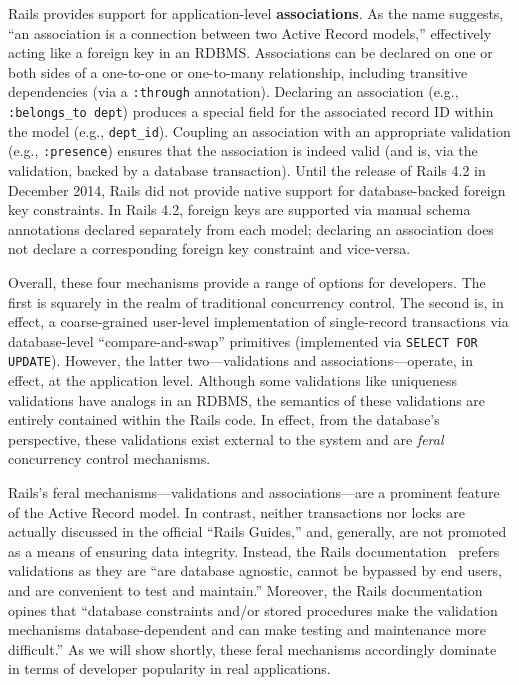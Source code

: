 \begin{myenumerate}
\item Rails provides support for application-level
  \textbf{associations}. As the name suggests, ``an association is a
  connection between two Active Record models,'' effectively acting
  like a foreign key in an RDBMS. Associations can be declared on one
  or both sides of a one-to-one or one-to-many relationship, including
  transitive dependencies (via a \texttt{:through}
  annotation). Declaring an association (e.g., \texttt{:belongs\_to
    dept}) produces a special field for the associated record ID
  within the model (e.g., \texttt{dept\_id}). Coupling an association
  with an appropriate validation (e.g., \texttt{:presence}) ensures
  that the association is indeed valid (and is, via the validation,
  backed by a database transaction). Until the release of Rails 4.2 in
  December 2014, Rails did not provide native support for
  database-backed foreign key constraints. In Rails 4.2, foreign keys
  are supported via manual schema annotations declared separately from
  each model; declaring an association does not declare a
  corresponding foreign key constraint and vice-versa.
\end{myenumerate}

Overall, these four mechanisms provide a range of options for
developers. The first is squarely in the realm of traditional
concurrency control. The second is, in effect, a coarse-grained
user-level implementation of single-record transactions via
database-level ``compare-and-swap'' primitives (implemented via
\texttt{SELECT FOR UPDATE}). However, the latter two---validations and
associations---operate, in effect, at the application level. Although
some validations like uniqueness validations have analogs in an RDBMS,
the semantics of these validations are entirely contained within the
Rails code. In effect, from the database's perspective, these
validations exist external to the system and are \textit{feral}
concurrency control mechanisms.

Rails's feral mechanisms---validations and associations---are a
prominent feature of the Active Record model. In contrast, neither
transactions nor locks are actually discussed in the official ``Rails
Guides,'' and, generally, are not promoted as a means of ensuring data
integrity. Instead, the Rails documentation~\cite{rails-guide} prefers
validations as they are ``are database agnostic, cannot be bypassed by
end users, and are convenient to test and maintain.'' Moreover, the
Rails documentation opines that ``database constraints and/or stored
procedures make the validation mechanisms database-dependent and can
make testing and maintenance more difficult.''  As we will show
shortly, these feral mechanisms accordingly dominate in terms of
developer popularity in real applications.


